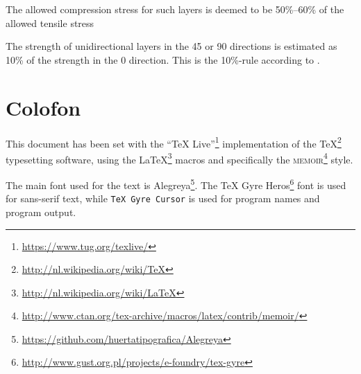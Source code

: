 \documentclass[a4paper,landscape,oneside,11pt,twocolumn]{memoir}
\begin{document}
The allowed compression stress for such layers is deemed to be 50\%--60\% of the
allowed tensile stress

The strength of unidirectional layers in the \textpm{}45\textdegree{} or
90\textdegree{} directions is estimated as 10\% of the strength in the
0\textdegree{} direction. This is the 10\%-rule according to
\citet{1992WeiEn..52...29H}.

%

\chapter{Colofon}

This document has been set with the “TeX
Live”\footnote{\url{https://www.tug.org/texlive/}} implementation of the
\TeX\footnote{\url{http://nl.wikipedia.org/wiki/TeX}} typesetting software,
using the \LaTeX\footnote{\url{http://nl.wikipedia.org/wiki/LaTeX}} macros and
specifically the \textsc{memoir}\footnote{%
    \url{http://www.ctan.org/tex-archive/macros/latex/contrib/memoir/}} style.

The main font used for the text is
Alegreya\footnote{\url{https://github.com/huertatipografica/Alegreya}}.  The
\textsf{TeX Gyre
Heros}\footnote{\url{http://www.gust.org.pl/projects/e-foundry/tex-gyre}} font
is used for sans-serif text, while \texttt{TeX Gyre Cursor} is used for
program names and program output.
\end{document}

